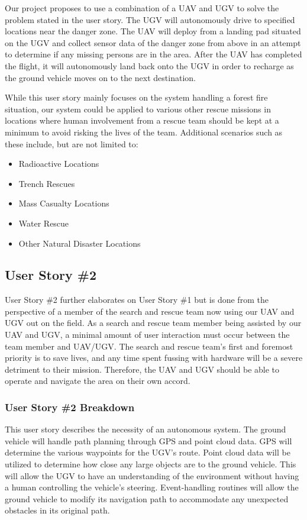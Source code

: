 Our project proposes to use a combination of a UAV and UGV to solve the problem stated in the user story. The UGV will autonomously drive to specified locations near the danger zone. The UAV will deploy from a landing pad situated on the UGV and collect sensor data of the danger zone from above in an attempt to determine if any missing persons are in the area. After the UAV has completed the flight, it will autonomously land back onto the UGV in order to recharge as the ground vehicle moves on to the next destination.

While this user story mainly focuses on the system handling a forest fire situation, our system could be applied to various other rescue missions in locations where human involvement from a rescue team should be kept at a minimum to avoid risking the lives of the team. Additional scenarios such as these include, but are not limited to:
\begin{itemize}
  \item Radioactive Locations
  \item Trench Rescues
  \item Mass Casualty Locations
  \item Water Rescue
  \item Other Natural Disaster Locations
\end{itemize}

\subsection{User Story \#2} 
User Story \#2 further elaborates on User Story \#1 but is done from the perspective of a member of the search and rescue team now using our UAV and UGV out on the field. As a search and rescue team member being assisted by our UAV and UGV, a minimal amount of user interaction must occur between the team member and UAV/UGV. The search and rescue team's first and foremost priority is to save lives, and any time spent fussing with hardware will be a severe detriment to their mission. Therefore, the UAV and UGV should be able to operate and navigate the area on their own accord.
 
\subsubsection{User Story \#2 Breakdown}
This user story describes the necessity of an autonomous system. The ground vehicle will handle path planning through GPS and point cloud data. GPS will determine the various waypoints for the UGV's route. Point cloud data will be utilized to determine how close any large objects are to the ground vehicle. This will allow the UGV to have an understanding of the environment without having a human controlling the vehicle's steering. Event-handling routines will allow the ground vehicle to modify its navigation path to accommodate any unexpected obstacles in its original path. 

